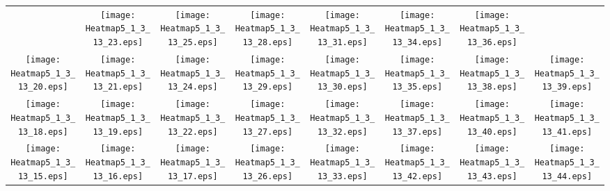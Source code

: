\documentclass{standalone}
\begin{document}
\renewcommand{\arraystretch}{0}
\setlength{\tabcolsep}{0pt}
\begin{tabular}{ *8{c} }
 & \texttt{[image: Heatmap5\_1\_3\_13\_23.eps]} & \texttt{[image: Heatmap5\_1\_3\_13\_25.eps]} & \texttt{[image: Heatmap5\_1\_3\_13\_28.eps]} & \texttt{[image: Heatmap5\_1\_3\_13\_31.eps]} & \texttt{[image: Heatmap5\_1\_3\_13\_34.eps]} & \texttt{[image: Heatmap5\_1\_3\_13\_36.eps]} &  \\
\texttt{[image: Heatmap5\_1\_3\_13\_20.eps]} & \texttt{[image: Heatmap5\_1\_3\_13\_21.eps]} & \texttt{[image: Heatmap5\_1\_3\_13\_24.eps]} & \texttt{[image: Heatmap5\_1\_3\_13\_29.eps]} & \texttt{[image: Heatmap5\_1\_3\_13\_30.eps]} & \texttt{[image: Heatmap5\_1\_3\_13\_35.eps]} & \texttt{[image: Heatmap5\_1\_3\_13\_38.eps]} & \texttt{[image: Heatmap5\_1\_3\_13\_39.eps]} \\
\texttt{[image: Heatmap5\_1\_3\_13\_18.eps]} & \texttt{[image: Heatmap5\_1\_3\_13\_19.eps]} & \texttt{[image: Heatmap5\_1\_3\_13\_22.eps]} & \texttt{[image: Heatmap5\_1\_3\_13\_27.eps]} & \texttt{[image: Heatmap5\_1\_3\_13\_32.eps]} & \texttt{[image: Heatmap5\_1\_3\_13\_37.eps]} & \texttt{[image: Heatmap5\_1\_3\_13\_40.eps]} & \texttt{[image: Heatmap5\_1\_3\_13\_41.eps]} \\
\texttt{[image: Heatmap5\_1\_3\_13\_15.eps]} & \texttt{[image: Heatmap5\_1\_3\_13\_16.eps]} & \texttt{[image: Heatmap5\_1\_3\_13\_17.eps]} & \texttt{[image: Heatmap5\_1\_3\_13\_26.eps]} & \texttt{[image: Heatmap5\_1\_3\_13\_33.eps]} & \texttt{[image: Heatmap5\_1\_3\_13\_42.eps]} & \texttt{[image: Heatmap5\_1\_3\_13\_43.eps]} & \texttt{[image: Heatmap5\_1\_3\_13\_44.eps]} \\

\end{tabular}
\end{document}

